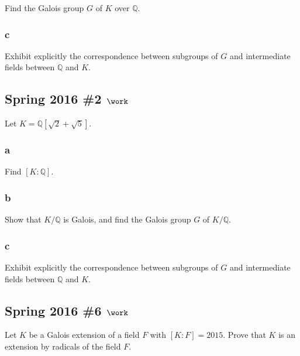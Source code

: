 Find the Galois group \(G\) of \(K\) over \({\mathbb{Q}}\).

\hypertarget{c-39}{%
\subsubsection{c}\label{c-39}}

Exhibit explicitly the correspondence between subgroups of \(G\) and
intermediate fields between \({\mathbb{Q}}\) and \(K\).

\hypertarget{spring-2016-2-work}{%
\subsection{\texorpdfstring{Spring 2016 \#2
\(\work\)}{Spring 2016 \#2 \textbackslash work}}\label{spring-2016-2-work}}

Let \(K = {\mathbb{Q}}[\sqrt 2 + \sqrt 5]\).

\hypertarget{a-69}{%
\subsubsection{a}\label{a-69}}

Find \([K: {\mathbb{Q}}]\).

\hypertarget{b-59}{%
\subsubsection{b}\label{b-59}}

Show that \(K/{\mathbb{Q}}\) is Galois, and find the Galois group \(G\)
of \(K/{\mathbb{Q}}\).

\hypertarget{c-40}{%
\subsubsection{c}\label{c-40}}

Exhibit explicitly the correspondence between subgroups of \(G\) and
intermediate fields between \({\mathbb{Q}}\) and \(K\).

\hypertarget{spring-2016-6-work}{%
\subsection{\texorpdfstring{Spring 2016 \#6
\(\work\)}{Spring 2016 \#6 \textbackslash work}}\label{spring-2016-6-work}}

Let \(K\) be a Galois extension of a field \(F\) with \([K: F] = 2015\).
Prove that \(K\) is an extension by radicals of the field \(F\).


